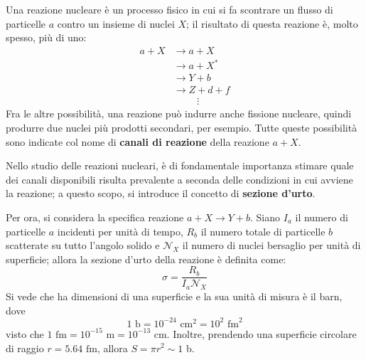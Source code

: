 \documentclass[11pt, a4paper]{scrartcl}
\theoremstyle{style}
\numberwithin{equation}{subsection}
\begin{document}
Una reazione nucleare \`e un processo fisico in cui si fa scontrare un flusso di particelle $a$ contro un insieme di nuclei $X$; il risultato di questa reazione \`e, molto spesso, pi\`u di uno:
\begin{align}
	a+X & \longrightarrow a + X \tag{scattering elastico}\\
	    &\longrightarrow a+X^* \tag{scattering anelastico}\\
	    &\longrightarrow Y+b \tag{nucleo e particella}\\
	    &\longrightarrow Z + d + f\tag{nucleo e pi\`u particelle}\\
	    &\hspace{1cm} \vdots \tag*{}
\end{align}
Fra le altre possibilit\`a, una reazione pu\`o indurre anche fissione nucleare, quindi produrre due nuclei pi\`u prodotti secondari, per esempio.
Tutte queste possibilit\`a sono indicate col nome di \textbf{canali di reazione} della reazione $a+X$.

Nello studio delle reazioni nucleari, \`e di fondamentale importanza stimare quale dei canali disponibili risulta prevalente a seconda delle condizioni in cui avviene la reazione; a questo scopo, si introduce il concetto di \textbf{sezione d'urto}.

Per ora, si considera la specifica reazione $a +X \to  Y+b$.
Siano $I_a$ il numero di particelle $a$ incidenti per unit\`a di tempo, $R_b$ il numero totale di particelle $b$ scatterate su tutto l'angolo solido e $\mathcal{N} _X$ il numero di nuclei bersaglio per unit\`a di superficie; allora la sezione d'urto della reazione \`e definita come:
\begin{equation}
	\sigma = \frac{R_b}{I_a \mathcal{N} _X}
\end{equation}
Si vede che ha dimensioni di una superficie e la sua unit\`a di misura \`e il barn, dove
\[
1\text{ b} = 10^{-24}\text{ cm}^2 = 10^2 \text{ fm}^2
\] 
visto che $1\text{ fm}= 10^{-15} \text{ m} = 10^{-13}\text{ cm}$.
Inoltre, prendendo una superficie circolare di raggio $r = 5.64\text{ fm}$, allora $S = \pi r^2 \sim 1 $ b.
\end{document}
